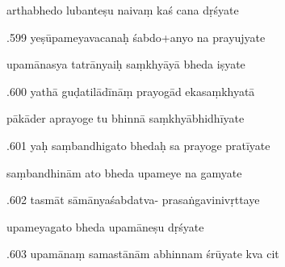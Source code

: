 \documentclass[article,12pt,a4paper]{memoir}%
\newcounter{parCount}
\begin{document}
	  
	  \pstart \leavevmode%
	arthabhedo lubanteṣu naivaṃ kaś cana dṛśyate 
	{}
	\pend%
      

	  
	  \pstart {}.599 yeṣūpameyavacanaḥ śabdo+anyo na prayujyate 
	{}
	\pend%
      

	  
	  \pstart \leavevmode%
	upamānasya tatrānyaiḥ saṃkhyāyā bheda iṣyate 
	{}
	\pend%
      

	  
	  \pstart {}.600 yathā guḍatilādīnāṃ prayogād ekasaṃkhyatā 
	{}
	\pend%
      

	  
	  \pstart \leavevmode%
	pākāder aprayoge tu bhinnā saṃkhyābhidhīyate 
	{}
	\pend%
      

	  
	  \pstart {}.601 yaḥ saṃbandhigato bhedaḥ sa prayoge pratīyate 
	{}
	\pend%
      

	  
	  \pstart \leavevmode%
	saṃbandhinām ato bheda upameye na gamyate 
	{}
	\pend%
      

	  
	  \pstart {}.602 tasmāt sāmānyaśabdatva-   prasaṅgavinivṛttaye 
	{}
	\pend%
      

	  
	  \pstart \leavevmode%
	upameyagato bheda upamāneṣu dṛśyate 
	{}
	\pend%
      

	  
	  \pstart {}.603 upamānaṃ samastānām abhinnam śrūyate kva cit 
	{}
	\pend%
      
\end{document}
